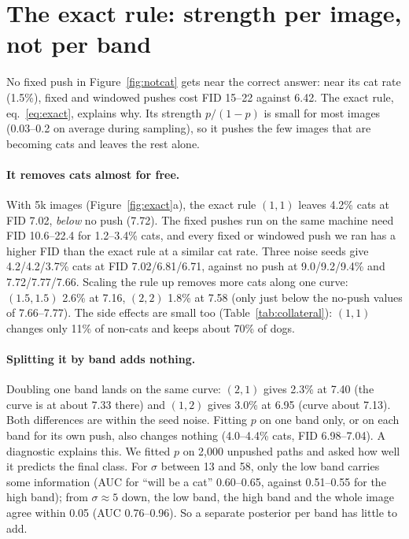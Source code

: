 \documentclass[11pt]{article}
\begin{document}
\section{The exact rule: strength per image, not per band}
\label{sec:exact}

No fixed push in Figure~\ref{fig:notcat} gets near the correct answer: near its cat rate (1.5\%), fixed and windowed
pushes cost FID 15--22 against 6.42. The exact rule, eq.~\eqref{eq:exact}, explains why. Its strength $p/(1-p)$ is
small for most images (0.03--0.2 on average during sampling), so it pushes the few images that are becoming cats and
leaves the rest alone.

\paragraph{It removes cats almost for free.} With 5k images (Figure~\ref{fig:exact}a), the exact rule $(1,1)$ leaves
4.2\% cats at FID 7.02, \emph{below} no push (7.72). The fixed pushes run on the same machine need FID 10.6--22.4 for
1.2--3.4\% cats, and every fixed or windowed push we ran has a higher FID than the exact rule at a similar cat rate. Three
noise seeds give 4.2/4.2/3.7\% cats at FID 7.02/6.81/6.71, against no push at 9.0/9.2/9.4\% and 7.72/7.77/7.66. Scaling
the rule up removes more cats along one curve: $(1.5,1.5)$ 2.6\% at 7.16, $(2,2)$ 1.8\% at 7.58 (only just below the
no-push values of 7.66--7.77). The side effects are small too (Table~\ref{tab:collateral}): $(1,1)$ changes only 11\% of
non-cats and keeps about 70\% of dogs.

\paragraph{Splitting it by band adds nothing.} Doubling one band lands on the same curve: $(2,1)$ gives 2.3\% at 7.40
(the curve is at about 7.33 there) and $(1,2)$ gives 3.0\% at 6.95 (curve about 7.13). Both differences are within the
seed noise. Fitting $p$ on one band only, or on each band for its own push, also changes nothing (4.0--4.4\% cats,
FID 6.98--7.04). A diagnostic explains this. We fitted $p$ on 2,000 unpushed paths and asked how well it predicts the
final class. For $\sigma$ between 13 and 58, only the low band carries some information (AUC for ``will be a cat''
0.60--0.65, against 0.51--0.55 for the high band); from $\sigma \approx 5$ down, the low band, the high band and the
whole image agree within 0.05 (AUC 0.76--0.96). So a separate posterior per band has little to add.
\end{document}

